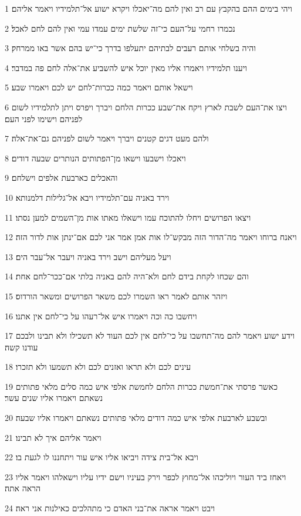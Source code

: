 \par 1 ויהי בימים ההם בהקבץ עם רב ואין להם מה־יאכלו ויקרא ישוע אל־תלמידיו ויאמר אליהם׃
\par 2 נכמרו רחמי על־העם כי־זה שלשת ימים עמדו עמי ואין להם לחם לאכל׃
\par 3 והיה בשלחי אותם רעבים לבתיהם יתעלפו בדרך כי־יש בהם אשר באו ממרחק׃
\par 4 ויענו תלמידיו ויאמרו אליו מאין יוכל איש להשביע את־אלה לחם פה במדבר׃
\par 5 וישאל אותם ויאמר כמה ככרות־לחם יש לכם ויאמרו שבע׃
\par 6 ויצו את־העם לשבת לארץ ויקח את־שבע ככרות הלחם ויברך ויפרס ויתן לתלמידיו לשום לפניהם וישימו לפני העם׃
\par 7 ולהם מעט דגים קטנים ויברך ויאמר לשום לפניהם גם־את־אלה׃
\par 8 ויאכלו וישבעו וישאו מן־הפתותים הנותרים שבעה דודים׃
\par 9 והאכלים כארבעת אלפים וישלחם׃
\par 10 וירד באניה עם־תלמידיו ויבא אל־גלילות דלמנותא׃
\par 11 ויצאו הפרושים ויחלו להתוכח עמו וישאלו מאתו אות מן־השמים למען נסתו׃
\par 12 ויאנח ברוחו ויאמר מה־הדור הזה מבקש־לו אות אמן אמר אני לכם אם־ינתן אות לדור הזה׃
\par 13 ויעל מעליהם וישב וירד באניה ויעבר אל־עבר הים׃
\par 14 והם שכחו לקחת בידם לחם ולא־היה להם באניה בלתי אם־ככר־לחם אחת׃
\par 15 ויזהר אותם לאמר ראו השמרו לכם משאר הפרושים ומשאר הורדוס׃
\par 16 ויחשבו כה וכה ויאמרו איש אל־רעהו על כי־לחם אין אתנו׃
\par 17 וידע ישוע ויאמר להם מה־תחשבו על כי־לחם אין לכם העוד לא תשכילו ולא תבינו ולבכם עודנו קשה׃
\par 18 עינים לכם ולא תראו ואזנים לכם ולא תשמעו ולא תזכרו׃
\par 19 כאשר פרסתי את־חמשת ככרות הלחם לחמשת אלפי איש כמה סלים מלאי פתותים נשאתם ויאמרו אליו שנים עשר׃
\par 20 ובשבע לארבעת אלפי איש כמה דודים מלאי פתותים נשאתם ויאמרו אליו שבעה׃
\par 21 ויאמר אליהם איך לא תבינו׃
\par 22 ויבא אל־בית צידה ויביאו אליו איש עור ויתחננו לו לגעת בו׃
\par 23 ויאחז ביד העור ויוליכהו אל־מחוץ לכפר וירק בעיניו וישם ידיו עליו וישאלהו ויאמר אליו הראה אתה׃
\par 24 ויבט ויאמר אראה את־בני האדם כי מתהלכים כאילנות אני ראה׃
